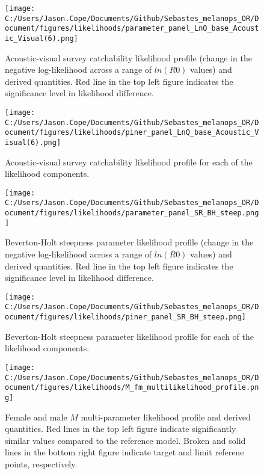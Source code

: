 \documentclass[11pt,
  english,
  letterpaper,
]{article}
\begin{document}
\begin{figure}
\centering
\texttt{[image: C:/Users/Jason.Cope/Documents/Github/Sebastes\_melanops\_OR/Document/figures/likelihoods/parameter\_panel\_LnQ\_base\_Acoustic\_Visual(6).png]}
\caption{Acoustic-visual survey catchability likelihood profile (change in the negative log-likelihood across a range of \(ln(R0)\) values) and derived quantities. Red line in the top left figure indicates the significance level in likelihood difference.\label{fig:AVq-profile}}
\end{figure}

\begin{figure}
\centering
\texttt{[image: C:/Users/Jason.Cope/Documents/Github/Sebastes\_melanops\_OR/Document/figures/likelihoods/piner\_panel\_LnQ\_base\_Acoustic\_Visual(6).png]}
\caption{Acoustic-visual survey catchability likelihood profile for each of the likelihood components.\label{fig:AVq-profile-components}}
\end{figure}

\begin{figure}
\centering
\texttt{[image: C:/Users/Jason.Cope/Documents/Github/Sebastes\_melanops\_OR/Document/figures/likelihoods/parameter\_panel\_SR\_BH\_steep.png]}
\caption{Beverton-Holt steepness parameter likelihood profile (change in the negative log-likelihood across a range of \(ln(R0)\) values) and derived quantities. Red line in the top left figure indicates the significance level in likelihood difference.\label{fig:steepness-profile}}
\end{figure}

\begin{figure}
\centering
\texttt{[image: C:/Users/Jason.Cope/Documents/Github/Sebastes\_melanops\_OR/Document/figures/likelihoods/piner\_panel\_SR\_BH\_steep.png]}
\caption{Beverton-Holt steepness parameter likelihood profile for each of the likelihood components.\label{fig:steepness-profile-components}}
\end{figure}

\begin{figure}
\centering
\texttt{[image: C:/Users/Jason.Cope/Documents/Github/Sebastes\_melanops\_OR/Document/figures/likelihoods/M\_fm\_multilikelihood\_profile.png]}
\caption{Female and male \(M\) multi-parameter likelihood profile and derived quantities. Red lines in the top left figure indicate significantly similar values compared to the reference model. Broken and solid lines in the bottom right figure indicate target and limit referene points, respectively.\label{fig:M-multiprofile-combo}}
\end{figure}
\end{document}
